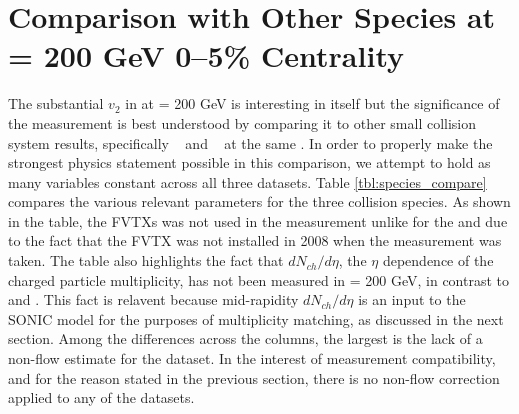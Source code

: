 \section{Comparison with Other Species at \sqsn =  200 GeV 0--5\% Centrality}
The substantial $v_2$ in \pau  at \sqsn =  200 GeV is interesting in itself but the significance of the measurement is best understood by comparing it to other small collision system results, specifically \hau~\cite{PhysRevLett.115.142301} and \dau~\cite{PhysRevLett.115.142301} at the same \sqsn. In order to properly make the strongest physics statement possible in this comparison, we attempt to hold as many variables constant across all three datasets. Table \ref{tbl:species_compare} compares the various relevant parameters for the three collision species. As shown in the table, the FVTXs was not used in the \dau measurement unlike for the \pau and \hau due to the fact that the FVTX was not installed in 2008 when the \dau measurement was taken. The table also highlights the fact that $dN_{ch}/d\eta$, the $\eta$ dependence of the charged particle multiplicity, has not been measured in \pau \sqsn = 200 GeV, in contrast to \hau and \dau. This fact is relavent because mid-rapidity $dN_{ch}/d\eta$ is an input to the SONIC model for the purposes of multiplicity matching, as discussed in the next section. Among the differences across the columns, the largest is the lack of a non-flow estimate for the \dau dataset. In the interest of measurement compatibility, and for the reason stated in the previous section, there is no non-flow correction applied to any of the datasets.

